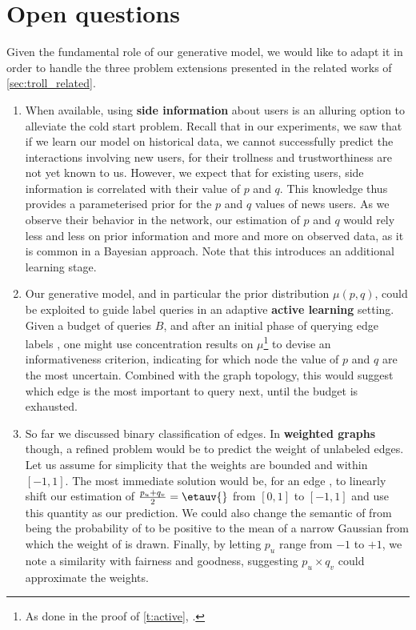 \section{Open questions}

Given the fundamental role of our generative model, we would like to adapt it in order to handle
the three problem extensions presented in the related works of \autoref{sec:troll_related}.

\begin{enumerate}[1.,]

  \item When available, using \textbf{side information} about users is an alluring option to
    alleviate the cold start problem. Recall that in our experiments, we saw that if we learn our
    model on historical data, we cannot successfully predict the interactions involving new users,
    for their trollness and trustworthiness are not yet known to us. However, we expect that for
    existing users, side information is correlated with their value of $p$ and $q$. This knowledge
    thus provides a parameterised prior for the $p$ and $q$ values of news users. As we observe
    their behavior in the network, our estimation of $p$ and $q$ would rely less and less on prior
    information and more and more on observed data, as it is common in a Bayesian approach. Note
    that this introduces an additional learning stage.

  \item Our generative model, and in particular the prior distribution $\mu(p,q)$, could be
    exploited to guide label queries in an adaptive \textbf{active learning} setting. Given a budget
    of queries $B$, and after an initial phase of querying edge labels \uar{}, one might use
    concentration results on $\mu$\footnote{As done in the proof of \autoref{t:active},
    .} to devise an informativeness criterion, indicating for which
    node the value of $p$ and $q$ are the most uncertain. Combined with the graph topology, this
    would suggest which edge is the most important to query next, until the budget is exhausted.

  \item So far we discussed binary classification of edges. In \textbf{weighted graphs} though, a
    refined problem would be to predict the weight of unlabeled edges. Let us assume for simplicity
    that the weights are bounded and within $[-1, 1]$. The most immediate solution would be, for an
    edge \euv{}, to linearly shift our estimation of $\frac{p_u+q_v}{2}=\etauv{}$ from $[0,1]$ to
    $[-1,1]$ and use this quantity as our prediction. We could also change the semantic of \etauv{}
    from being the probability of \euv{} to be positive to the mean of a narrow Gaussian from which
    the weight of \euv{} is drawn. Finally, by letting $p_u$ range from $-1$ to $+1$, we note a
    similarity with fairness and goodness, suggesting $p_u\times q_v$ could approximate the weights.
\end{enumerate}

